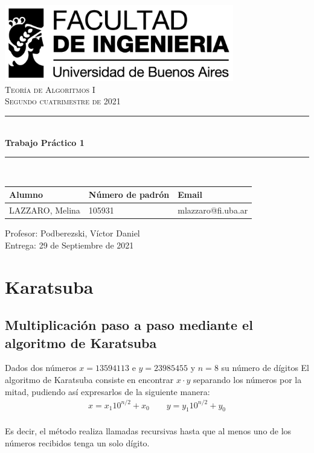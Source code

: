\documentclass[titlepage,a4paper]{article}
\newcommand{\HRule}{\rule{\linewidth}{0.5mm}}
\begin{document}
\begin{titlepage} %
	\includegraphics[width=0.75\textwidth]{logofiuba.jpg}\\[4cm] 
    \centering
    \textsc{\LARGE Teoría de Algoritmos I}\\[0.5cm]
    \textsc{\Large Segundo cuatrimestre de 2021 }\\[0.5cm]  
    \HRule \\[0.4cm]
    {\huge \bfseries Trabajo Práctico 1}\\[0.3cm]
    \HRule \\[2cm]
  	\Large
  	\begin{tabular}{ | l | l | l | }
  	    \hline
  	     Alumno & Número de padrón & Email \\ \hline
  	     LAZZARO, Melina & 105931 & mlazzaro@fi.uba.ar\\
  	     \hline
  	\end{tabular}
  	\vfill
            {\Large Profesor: Podberezski, Víctor Daniel}\\
  	\vfill
  	{\large Entrega: 29 de Septiembre de 2021}
\end{titlepage}

\tableofcontents %
\newpage

\section{Karatsuba}
\subsection{Multiplicación paso a paso mediante el algoritmo de Karatsuba}

Dados dos números  \textbf{$x=13594113$}  e  \textbf{$y=23985455$}  y  $n=8$  su número de dígitos 
El algoritmo de Karatsuba consiste en encontrar $x\cdot y$ separando los números por la mitad, pudiendo así expresarlos de la siguiente manera:
\begin{gather*} 
x = x_1 10^{n/2} + x_0  \qquad y = y_1 10^{n/2} + y_0 
\end{gather*}
\\
Es decir, el método realiza llamadas recursivas hasta que al menos uno de los números recibidos tenga un solo dígito.
\end{document}
